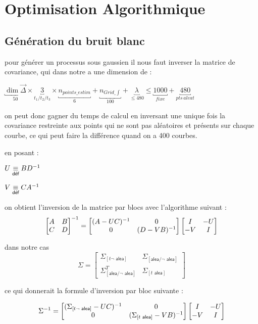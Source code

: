 \section{Optimisation Algorithmique}

\subsection{Génération du bruit blanc}

pour générer un processus sous gaussien il nous faut inverser la matrice de covariance, qui dans notre a une dimension de :

$\underbracket{\dim \vec\Delta}_{50} \times \underbracket{3}_{t_1 / t_2 / t_3} \times \underbracket{n_{points\_estim}}_{6} + \underbracket{n_{Grid\_\int}}_{100} + \underbracket{\lambda}_{\leq 480} \leq \underbracket{1000}_{fixe} + \underbracket{480}_{pts \, aleat}$

on peut donc gagner du temps de calcul en inversant une unique fois la covariance restreinte aux points qui ne sont pas aléatoires et présents sur chaque courbe, ce qui peut faire la différence quand on a 400 courbes.

en posant : 

$U \isdef B \inverse D$

$V \isdef C \inverse A$


on obtient l'inversion de la matrice par blocs avec l'algorithme suivant :
$$
\begin{bmatrix}
A & B \\
C & D
\end{bmatrix}^{-1}
=
\begin{bmatrix}
\inverse{(A - UC)} & 0 \\
0 & \inverse{(D - VB)}
\end{bmatrix}
\begin{bmatrix}
I & - U \\
- V & I
\end{bmatrix}
$$

dans notre cas 
$$\Sigma = \begin{bmatrix}
    \Sigma_{[t \neg\textsf{ alea}]} & \Sigma_{[\textsf{alea} / \neg \textsf{ alea}]}
    \\ \Sigma^T_{[\textsf{alea} / \neg \textsf{ alea}]}
     & \Sigma_{[t \textsf{ alea}]} 
\end{bmatrix}$$

ce qui donnerait la formule d'inversion par bloc suivante :

$$
\inverse \Sigma
=
\begin{bmatrix}
    \inverse{(\Sigma_{[t \neg\textsf{ alea}]} - UC)} & 0 \\
    0 & \inverse{(\Sigma_{[t \textsf{ alea}]} - VB)}
    \end{bmatrix}
    \begin{bmatrix}
    I & - U \\
    - V & I
    \end{bmatrix}
$$

